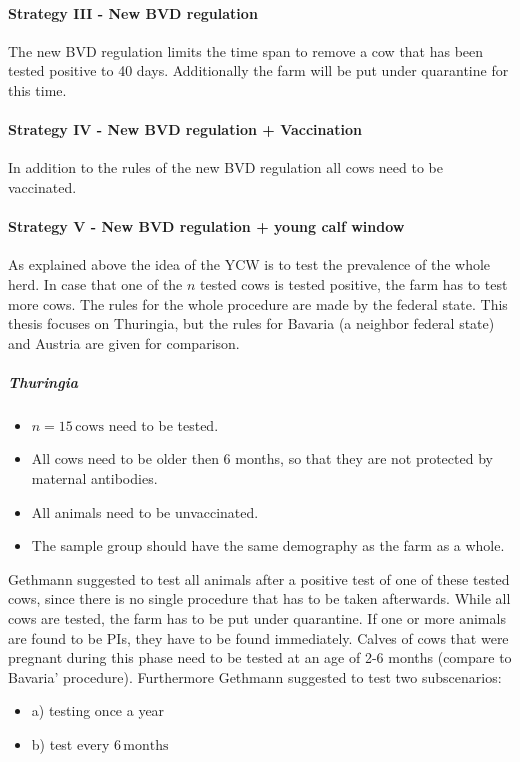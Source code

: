 \paragraph{Strategy III - New BVD regulation}
The new BVD regulation limits the time span to remove a cow that has been tested positive to 40 days. Additionally the farm will be put under quarantine for this time. 
\paragraph{Strategy IV - New BVD regulation + Vaccination}
In addition to the rules of the new BVD regulation all cows need to be vaccinated.
\paragraph{Strategy V - New BVD regulation + young calf window}
As explained above the idea of the YCW is to test the prevalence of the whole herd. In case that one of the $n$ tested cows is tested positive, the farm has to test more cows. The rules for the whole procedure are made by the federal state. This thesis focuses on Thuringia, but the rules for Bavaria (a neighbor federal state) and Austria are given for comparison.
\subparagraph{Thuringia}
\begin{itemize}
\item $n = 15\,\text{cows}$ need to be tested.
\item All cows need to be older then 6 months, so that they are not protected by maternal antibodies.
\item All animals need to be unvaccinated.
\item The sample group should have the same demography as the farm as a whole.
\end{itemize}
Gethmann suggested to test all animals after a positive test of one of these tested cows, since there is no single procedure that has to be taken afterwards. While all cows are tested, the farm has to be put under quarantine. If one or more animals are found to be PIs, they have to be found immediately. Calves of cows that were pregnant during this phase need to be tested at an age of 2-6 months (compare to Bavaria' procedure). Furthermore Gethmann suggested to test two subscenarios:
\begin{itemize}
\item a) testing once a year
\item b) test every $6\,\text{months}$
\end{itemize}

